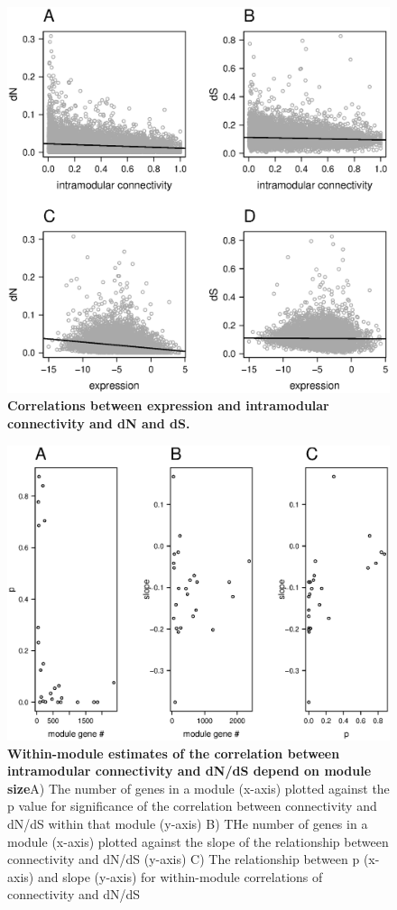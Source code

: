 \begin{figure}[ht!]
      \centering
       \includegraphics[width=\linewidth]{Ch4FigCorr}
    \caption{\textbf{Correlations between expression and intramodular connectivity and dN and dS.}}
    \label{fig:fsCorr}
\end{figure}


\begin{figure}[ht!]
      \centering
       \includegraphics[width=\linewidth]{Ch4FigMod}
    \caption{\textbf{ Within-module estimates of the correlation between intramodular connectivity and dN/dS depend on module size}A) The number of genes in a module (x-axis) plotted against the p value for significance of the correlation between connectivity and dN/dS within that module (y-axis) B) THe number of genes in a module (x-axis) plotted against the slope of the relationship between connectivity and dN/dS (y-axis) C) The relationship between p (x-axis) and slope (y-axis) for within-module correlations of connectivity and dN/dS }
    \label{fig:fsMod}
\end{figure}




